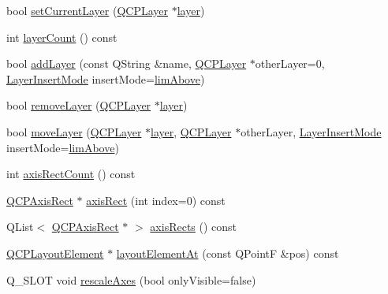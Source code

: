 \begin{DoxyCompactItemize}
\item 
bool \hyperlink{class_q_custom_plot_a23a4d3cadad1a0063c5fe19aac5659e6}{set\-Current\-Layer} (\hyperlink{class_q_c_p_layer}{Q\-C\-P\-Layer} $\ast$\hyperlink{class_q_custom_plot_aac492da01782820454e9136a8db28182}{layer})
\item 
int \hyperlink{class_q_custom_plot_a1b3926884f5bd4bdda1495d8b3c891d0}{layer\-Count} () const 
\item 
bool \hyperlink{class_q_custom_plot_ad5255393df078448bb6ac83fa5db5f52}{add\-Layer} (const Q\-String \&name, \hyperlink{class_q_c_p_layer}{Q\-C\-P\-Layer} $\ast$other\-Layer=0, \hyperlink{class_q_custom_plot_a75a8afbe6ef333b1f3d47abb25b9add7}{Layer\-Insert\-Mode} insert\-Mode=\hyperlink{class_q_custom_plot_a75a8afbe6ef333b1f3d47abb25b9add7a062b0b7825650b432a713c0df6742d41}{lim\-Above})
\item 
bool \hyperlink{class_q_custom_plot_a40f75e342c5eaab6a86066a42a0e2a94}{remove\-Layer} (\hyperlink{class_q_c_p_layer}{Q\-C\-P\-Layer} $\ast$\hyperlink{class_q_custom_plot_aac492da01782820454e9136a8db28182}{layer})
\item 
bool \hyperlink{class_q_custom_plot_ae896140beff19424e9e9e02d6e331104}{move\-Layer} (\hyperlink{class_q_c_p_layer}{Q\-C\-P\-Layer} $\ast$\hyperlink{class_q_custom_plot_aac492da01782820454e9136a8db28182}{layer}, \hyperlink{class_q_c_p_layer}{Q\-C\-P\-Layer} $\ast$other\-Layer, \hyperlink{class_q_custom_plot_a75a8afbe6ef333b1f3d47abb25b9add7}{Layer\-Insert\-Mode} insert\-Mode=\hyperlink{class_q_custom_plot_a75a8afbe6ef333b1f3d47abb25b9add7a062b0b7825650b432a713c0df6742d41}{lim\-Above})
\item 
int \hyperlink{class_q_custom_plot_a340fa24b1607e445cedda9685670ead3}{axis\-Rect\-Count} () const 
\item 
\hyperlink{class_q_c_p_axis_rect}{Q\-C\-P\-Axis\-Rect} $\ast$ \hyperlink{class_q_custom_plot_a4a37a1add5fe63060ac518cf0a4c4050}{axis\-Rect} (int index=0) const 
\item 
Q\-List$<$ \hyperlink{class_q_c_p_axis_rect}{Q\-C\-P\-Axis\-Rect} $\ast$ $>$ \hyperlink{class_q_custom_plot_afd67094aaeccbc5719761348b2d8c891}{axis\-Rects} () const 
\item 
\hyperlink{class_q_c_p_layout_element}{Q\-C\-P\-Layout\-Element} $\ast$ \hyperlink{class_q_custom_plot_a840458186d4483c8a42d6a399448d38f}{layout\-Element\-At} (const Q\-Point\-F \&pos) const 
\item 
Q\-\_\-\-S\-L\-O\-T void \hyperlink{class_q_custom_plot_a6c5de7d75ac2898c15b7969cc646b6ec}{rescale\-Axes} (bool only\-Visible=false)

\end{DoxyCompactItemize}
